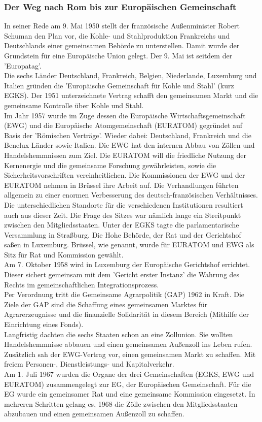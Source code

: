 \documentclass[letterpaper, 12pt]{article}
\let\tempsubsubsection\subsubsection
\renewcommand\subsubsection[1]{\vspace{0cm}\tempsubsubsection{#1}\vspace{0cm}}
\begin{document}
\subsubsection{Der Weg nach Rom bis zur Europäischen Gemeinschaft}

In seiner Rede am 9. Mai 1950 stellt der französische Außenminister Robert Schuman den Plan vor, die Kohle- und Stahlproduktion Frankreichs und Deutschlands einer gemeinsamen Behörde zu unterstellen. Damit wurde der Grundstein für eine Europäische Union gelegt. Der 9. Mai ist seitdem der 'Europatag'. \\
Die sechs Länder Deutschland, Frankreich, Belgien, Niederlande, Luxemburg und Italien gründen die 'Europäische Gemeinschaft für Kohle und Stahl' (kurz EGKS). Der 1951 unterzeichnete Vertrag schafft den gemeinsamen Markt und die gemeinsame Kontrolle über Kohle und Stahl. \\
Im Jahr 1957 wurde im Zuge dessen die Europäische Wirtschaftsgemeinschaft (EWG) und die Europäische Atomgemeinschaft (EURATOM) gegründet auf Basis der 'Römischen Verträge'. Wieder dabei: Deutschland, Frankreich und die Benelux-Länder sowie Italien. Die EWG hat den internen Abbau von Zöllen und Handelshemmnissen zum Ziel. Die EURATOM will die friedliche Nutzung der Kernenergie und die gemeinsame Forschung gewährleisten, sowie die Sicherheitsvorschriften vereinheitlichen. Die Kommissionen der EWG und der EURATOM nehmen in Brüssel ihre Arbeit auf. Die Verhandlungen führten allgemein zu einer enormen Verbesserung des deutsch-französischen Verhältnisses. \\
Die unterschiedlichen Standorte für die verschiedenen Institutionen resultiert auch aus dieser Zeit. Die Frage des Sitzes war nämlich lange ein Streitpunkt zwischen den Mitgliedsstaaten. Unter der EGKS tagte die parlamentarische Versammlung in Straßburg. Die Hohe Behörde, der Rat und der Gerichtshof saßen in Luxemburg. Brüssel, wie genannt, wurde für EURATOM und EWG als Sitz für Rat und Kommission gewählt. \\
Am 7. Oktober 1958 wird in Luxemburg der Europäische Gerichtshof errichtet. Dieser sichert gemeinsam mit dem 'Gericht erster Instanz' die Wahrung des Rechts im gemeinschaftlichen Integrationsprozess. \\
Per Verordnung tritt die Gemeinsame Agrarpolitik (GAP) 1962 in Kraft. Die Ziele der GAP sind die Schaffung eines gemeinsamen Marktes für Agrarerzeugnisse und die finanzielle Solidarität in diesem Bereich (Mithilfe der Einrichtung eines Fonds). \\
Langfristig dachten die sechs Staaten schon an eine Zollunion. Sie wollten Handelshemmnisse abbauen und einen gemeinsamen Außenzoll ins Leben rufen. Zusätzlich sah der EWG-Vertrag vor, einen gemeinsamen Markt zu schaffen. Mit freiem Personen-, Dienstleistungs- und Kapitalverkehr. \\
Am 1. Juli 1967 wurden die Organe der drei Gemeinschaften (EGKS, EWG und EURATOM) zusammengelegt zur EG, der Europäischen Gemeinschaft. Für die EG wurde ein gemeinsamer Rat und eine gemeinsame Kommission eingesetzt. In mehreren Schritten gelang es, 1968 die Zölle zwischen den Mitgliedsstaaten abzubauen und einen gemeinsamen Außenzoll zu schaffen.
\end{document}
